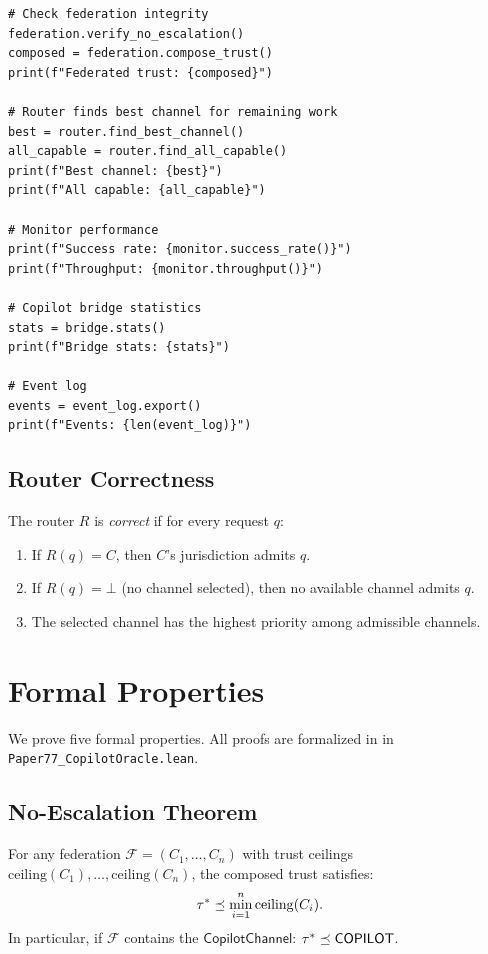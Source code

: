 \documentclass[11pt]{article}
\newcommand{\CopChan}{\mathsf{CopilotChannel}}
\newcommand{\TrustCeil}{\mathrm{ceiling}}
\begin{document}
\begin{lstlisting}[style=jugeo-python, caption={Full oracle verification pipeline with routing.}, label=lst:pipeline]
# Check federation integrity
federation.verify_no_escalation()
composed = federation.compose_trust()
print(f"Federated trust: {composed}")

# Router finds best channel for remaining work
best = router.find_best_channel()
all_capable = router.find_all_capable()
print(f"Best channel: {best}")
print(f"All capable: {all_capable}")

# Monitor performance
print(f"Success rate: {monitor.success_rate()}")
print(f"Throughput: {monitor.throughput()}")

# Copilot bridge statistics
stats = bridge.stats()
print(f"Bridge stats: {stats}")

# Event log
events = event_log.export()
print(f"Events: {len(event_log)}")
\end{lstlisting}

\subsection{Router Correctness}
\label{sec:routing:correct}

\begin{definition}
\label{def:router-correct}
The router $R$ is \emph{correct} if for every request $q$:
\begin{enumerate}
\item If $R(q) = C$, then $C$'s jurisdiction admits $q$.
\item If $R(q) = \bot$ (no channel selected), then no available
  channel admits $q$.
\item The selected channel has the highest priority among
  admissible channels.
\end{enumerate}
\end{definition}

\section{Formal Properties}
\label{sec:formal}

We prove five formal properties.  All proofs are formalized in
\LEAN{} in \texttt{Paper77\_CopilotOracle.lean}.

\subsection{No-Escalation Theorem}
\label{sec:formal:noescal}

\begin{theorem}
\label{thm:no-escal}
For any federation $\mathcal{F} = (C_1, \ldots, C_n)$ with
trust ceilings $\TrustCeil(C_1), \ldots, \TrustCeil(C_n)$,
the composed trust satisfies:
\[
  \tau^* \tleq \min_{i=1}^{n} \TrustCeil(C_i).
\]
In particular, if $\mathcal{F}$ contains the $\CopChan$:
$\tau^* \preceq \mathsf{COPILOT}$.
\end{theorem}
\end{document}
